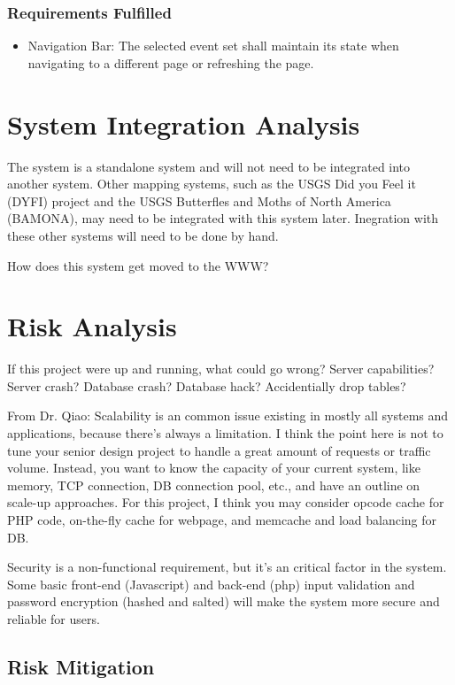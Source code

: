 \subsubsection{Requirements Fulfilled}
\begin{itemize}
\item Navigation Bar: The selected event set shall maintain its state when navigating to a different page or refreshing the page.
\end{itemize}

\section{System Integration Analysis}
The system is a standalone system and will not need to be integrated into another system. Other mapping systems, such as the USGS Did you Feel it (DYFI) project and the USGS Butterfles and Moths of North America (BAMONA), may need to be integrated with this system later. Inegration with these other systems will need to be done by hand.

How does this system get moved to the WWW?

\section{Risk Analysis}
If this project were up and running, what could go wrong? Server capabilities? Server crash? Database crash? Database hack? Accidentially drop tables?

From Dr. Qiao:
 Scalability is an common issue existing in mostly all systems and applications, because there’s always a limitation. I think the point here is not to tune your senior design project to handle a great amount of requests or traffic volume. Instead, you want to know the capacity of your current system, like memory, TCP connection, DB connection pool, etc., and have an outline on scale-up approaches. For this project, I think you may consider opcode cache for PHP code, on-the-fly cache for webpage, and memcache and load balancing for DB.  
 
Security is a non-functional requirement, but it’s an critical factor in the system. Some basic front-end (Javascript) and back-end (php) input validation and password encryption (hashed and salted) will make the system more secure and reliable for users. 

\subsection{Risk Mitigation}


